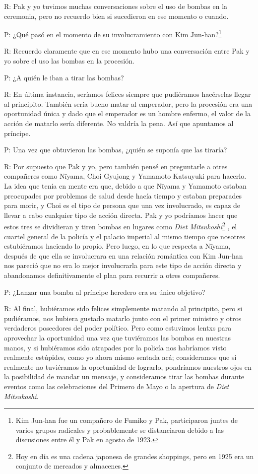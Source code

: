 \documentclass[
]{book}
\begin{document}
R: Pak y yo tuvimos muchas conversaciones sobre el uso de bombas en la ceremonia, pero no recuerdo bien si sucedieron en ese momento o cuando.

P: ¿Qué pasó en el momento de su involucramiento con Kim Jun-han?\footnote{Kim Jun-han fue un compañero de Fumiko y Pak, participaron juntes de varios grupos radicales y probablemente se distanciaron debido a las discusiones entre él y Pak en agosto de 1923.}

R: Recuerdo claramente que en ese momento hubo una conversación entre Pak y yo sobre el uso las bombas en la procesión.

P: ¿A quién le iban a tirar las bombas?

R: En última instancia, seríamos felices siempre que pudiéramos hacérselas llegar al principito. También sería bueno matar al emperador, pero la procesión era una oportunidad única y dado que el emperador es un hombre enfermo, el valor de la acción de matarlo sería diferente. No valdría la pena. Así que apuntamos al príncipe.

P: Una vez que obtuvieron las bombas, ¿quién se suponía que las tiraría?

R: Por supuesto que Pak y yo, pero también pensé en preguntarle a otres compañeres como Nīyama, Choi Gyujong y Yamamoto Katsuyuki para hacerlo. La idea que tenía en mente era que, debido a que Nīyama y Yamamoto estaban preocupades por problemas de salud desde hacía tiempo y estaban preparades para morir, y Choi es el tipo de persona que una vez involucrado, es capaz de llevar a cabo cualquier tipo de acción directa.
Pak y yo podríamos hacer que estos tres se dividieran y tiren bombas en lugares como \emph{Diet Mitsukoshi}\footnote{Hoy en día es una cadena japonesa de grandes shoppings, pero en 1925 era un conjunto de mercados y almacenes.} , el cuartel general de la policía y el palacio imperial al mismo tiempo que nosotres estubiéramos haciendo lo propio.
Pero luego, en lo que respecta a Nīyama, después de que ella se involucrara en una relación romántica con Kim Jun-han nos pareció que no era lo mejor involucrarla para este tipo de acción directa y abandonamos definitivamente el plan para recurrir a otres compañeres.

P: ¿Lanzar una bomba al príncipe heredero era su único objetivo?

R: Al final, hubiéramos sido felices simplemente matando al principito, pero si pudiéramos, nos hubiera gustado matarlo junto con el primer ministro y otros verdaderos poseedores del poder político. Pero como estuvimos lentxs para aprovechar la oportunidad una vez que tuviéramos las bombas en nuestras manos, y si hubiéramos sido atrapades por la policía nos habríamos visto realmente estúpides, como yo ahora mismo sentada acá; consideramos que si realmente no tuviéramos la oportunidad de lograrlo, pondríamos nuestros ojos en la posibilidad de mandar un mensaje, y consideramos tirar las bombas durante eventos como las celebraciones del Primero de Mayo o la apertura de \emph{Diet Mitsukoshi}.
\end{document}
